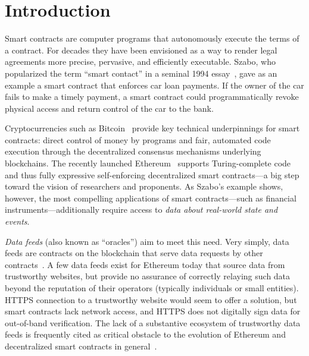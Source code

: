 \section{Introduction}

Smart contracts are computer programs that autonomously execute the terms of a contract.
For decades they have been envisioned as a way to render legal agreements more precise, pervasive, and efficiently executable.
Szabo, who popularized the term ``smart contact'' in a seminal 1994 essay~\cite{szabosmartcontract94}, gave as an example a smart contract that enforces car loan payments. If the owner of the car fails to make a timely payment, a smart contract could programmatically revoke physical access and return control of the car to the bank. %

Cryptocurrencies such as Bitcoin~\cite{bitcoin} provide key technical underpinnings for smart contracts: direct control of money by programs and fair, automated code execution through the decentralized consensus mechanisms underlying  blockchains. 
The recently launched Ethereum~\cite{yellowpaper,whitepaper} supports Turing-complete code and thus fully expressive self-enforcing decentralized smart contracts---a big step toward the vision of researchers and proponents.  
As Szabo's example shows, however, the most compelling applications of smart contracts---such as financial instruments---additionally require access to {\em data about real-world state and events}. 

\emph{Data feeds} (also known as ``oracles'') aim to meet this need. Very simply, data feeds are contracts on the blockchain that serve data requests by other contracts~\cite{whitepaper,yellowpaper}. A few data feeds exist for Ethereum today that source data from trustworthy websites, but provide no assurance of correctly relaying such data beyond the reputation of their operators (typically individuals or small entities). HTTPS connection to a trustworthy website would seem to offer a solution, but smart contracts lack network access, and HTTPS does not digitally sign data for out-of-band verification. The lack of a substantive ecosystem of trustworthy data feeds is frequently cited as critical obstacle to the evolution of Ethereum and decentralized smart contracts 
in general~\cite{GreenspanCoinDesk}.

